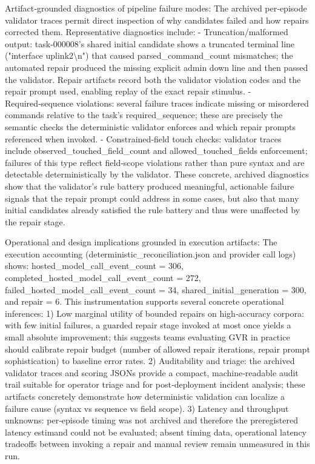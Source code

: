 \documentclass[conference]{IEEEtran}
\begin{document}
Artifact‑grounded diagnostics of pipeline failure modes: The archived per‑episode validator traces permit direct inspection of why candidates failed and how repairs corrected them. Representative diagnostics include:
- Truncation/malformed output: task-000008's shared initial candidate shows a truncated terminal line ("interface uplink2\textbackslash{}n") that caused parsed\_command\_count mismatches; the automated repair produced the missing explicit admin down line and then passed the validator. Repair artifacts record both the validator violation codes and the repair prompt used, enabling replay of the exact repair stimulus.
- Required‑sequence violations: several failure traces indicate missing or misordered commands relative to the task's required\_sequence; these are precisely the semantic checks the deterministic validator enforces and which repair prompts referenced when invoked.
- Constrained‑field touch checks: validator traces include observed\_touched\_field\_count and allowed\_touched\_fields enforcement; failures of this type reflect field‑scope violations rather than pure syntax and are detectable deterministically by the validator.
These concrete, archived diagnostics show that the validator's rule battery produced meaningful, actionable failure signals that the repair prompt could address in some cases, but also that many initial candidates already satisfied the rule battery and thus were unaffected by the repair stage.

Operational and design implications grounded in execution artifacts: The execution accounting (deterministic\_reconciliation.json and provider call logs) shows: hosted\_model\_call\_event\_count = 306, completed\_hosted\_model\_call\_event\_count = 272, failed\_hosted\_model\_call\_event\_count = 34, shared\_initial\_generation = 300, and repair = 6. This instrumentation supports several concrete operational inferences:
1) Low marginal utility of bounded repairs on high‑accuracy corpora: with few initial failures, a guarded repair stage invoked at most once yields a small absolute improvement; this suggests teams evaluating GVR in practice should calibrate repair budget (number of allowed repair iterations, repair prompt sophistication) to baseline error rates. 2) Auditability and triage: the archived validator traces and scoring JSONs provide a compact, machine‑readable audit trail suitable for operator triage and for post‑deployment incident analysis; these artifacts concretely demonstrate how deterministic validation can localize a failure cause (syntax vs sequence vs field scope). 3) Latency and throughput unknowns: per‑episode timing was not archived and therefore the preregistered latency estimand could not be evaluated; absent timing data, operational latency tradeoffs between invoking a repair and manual review remain unmeasured in this run.
\end{document}
